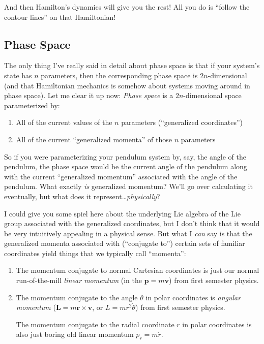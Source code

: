 \documentclass[]{article}
\begin{document}
And then Hamilton's dynamics will give you the rest! All you do is ``follow the
contour lines'' on that Hamiltonian!

\subsection{Phase Space}\label{phase-space}

The only thing I've really said in detail about phase space is that if your
system's state has \(n\) parameters, then the corresponding phase space is
\(2n\)-dimensional (and that Hamiltonian mechanics is somehow about systems
moving around in phase space). Let me clear it up now: \emph{Phase space} is a
\(2n\)-dimensional space parameterized by:

\begin{enumerate}
\def\labelenumi{\arabic{enumi}.}
\tightlist
\item
  All of the current values of the \(n\) parameters (``generalized
  coordinates'')
\item
  All of the current ``generalized momenta'' of those \(n\) parameters
\end{enumerate}

So if you were parameterizing your pendulum system by, say, the angle of the
pendulum, the phase space would be the current angle of the pendulum along with
the current ``generalized momentum'' associated with the angle of the pendulum.
What exactly \emph{is} generalized momentum? We'll go over calculating it
eventually, but what does it represent\ldots{}\emph{physically}?

I could give you some spiel here about the underlying Lie algebra of the Lie
group associated with the generalized coordinates, but I don't think that it
would be very intuitively appealing in a physical sense. But what I \emph{can}
say is that the generalized momenta associated with (``conjugate to'') certain
sets of familiar coordinates yield things that we typically call ``momenta'':

\begin{enumerate}
\def\labelenumi{\arabic{enumi}.}
\item
  The momentum conjugate to normal Cartesian coordinates is just our normal
  run-of-the-mill \emph{linear momentum} (in the \(\mathbf{p} = m \mathbf{v}\))
  from first semester physics.
\item
  The momentum conjugate to the angle \(\theta\) in polar coordinates is
  \emph{angular momentum} (\(\mathbf{L} = m \mathbf{r} \times \mathbf{v}\), or
  \(L = m r^2 \dot{\theta}\)) from first semester physics.

  The momentum conjugate to the radial coordinate \(r\) in polar coordinates is
  also just boring old linear momentum \(p_r = m \dot{r}\).
\end{enumerate}
\end{document}
